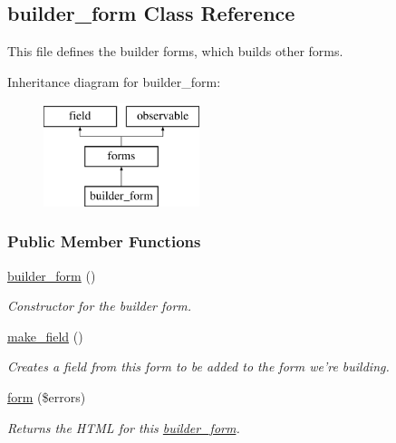 \hypertarget{classbuilder__form}{\subsection{builder\-\_\-form Class Reference}
\label{classbuilder__form}
}


This file defines the builder forms, which builds other forms.  


Inheritance diagram for builder\-\_\-form\-:\begin{figure}[H]
\begin{center}
\leavevmode
\includegraphics[height=3.000000cm]{classbuilder__form}
\end{center}
\end{figure}
\subsubsection*{Public Member Functions}
\begin{DoxyCompactItemize}
\item 
\hypertarget{classbuilder__form_a3ffef39ae7e16de827d3a1467b8085a2}{\hyperlink{classbuilder__form_a3ffef39ae7e16de827d3a1467b8085a2}{builder\-\_\-form} ()}\label{classbuilder__form_a3ffef39ae7e16de827d3a1467b8085a2}

\begin{DoxyCompactList}\small\item\em Constructor for the builder form. \end{DoxyCompactList}\item 
\hyperlink{classbuilder__form_a6408926fe73438032738d8a0095acf8d}{make\-\_\-field} ()
\begin{DoxyCompactList}\small\item\em Creates a field from this form to be added to the form we're building. \end{DoxyCompactList}\item 
\hyperlink{classbuilder__form_a250c986a9670cfe69371d854209991ba}{form} (\$errors)
\begin{DoxyCompactList}\small\item\em Returns the H\-T\-M\-L for this \hyperlink{classbuilder__form}{builder\-\_\-form}. \end{DoxyCompactList}\end{DoxyCompactItemize}
